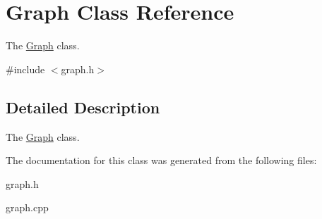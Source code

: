 \hypertarget{classGraph}{\section{Graph Class Reference}
\label{classGraph}
}


The \hyperlink{classGraph}{Graph} class.  




{\ttfamily \#include $<$graph.\-h$>$}



\subsection{Detailed Description}
The \hyperlink{classGraph}{Graph} class. 

The documentation for this class was generated from the following files\-:\begin{DoxyCompactItemize}
\item 
graph.\-h\item 
graph.\-cpp\end{DoxyCompactItemize}
